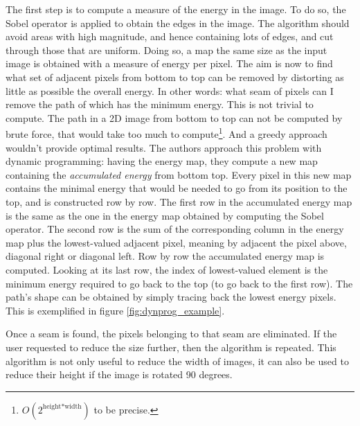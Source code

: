 \documentclass[../main.tex]{subfiles}
\begin{document}
The first step is to compute a measure of the energy in the image. To do so, the Sobel operator is applied to obtain the edges in the image. The algorithm should avoid areas with high magnitude, and hence containing lots of edges, and cut through those that are uniform. Doing so, a map the same size as the input image is obtained with a measure of energy per pixel. The aim is now to find what set of adjacent pixels from bottom to top can be removed by distorting as little as possible the overall energy. In other words: what seam of pixels can I remove the path of which has the minimum energy. This is not trivial to compute. The path in a 2D image from bottom to top can not be computed by brute force, that would take too much to compute\footnote{$O(2^{\text{height*width}})$ to be precise.}. And a greedy approach wouldn't provide optimal results. The authors approach this problem with dynamic programming: having the energy map, they compute a new map containing the \emph{accumulated energy} from bottom top. Every pixel in this new map contains the minimal energy that would be needed to go from its position to the top, and is constructed row by row. The first row in the accumulated energy map is the same as the one in the energy map obtained by computing the Sobel operator. The second row is the sum of the corresponding column in the energy map plus the lowest-valued adjacent pixel, meaning by adjacent the pixel above, diagonal right or diagonal left. Row by row the accumulated energy map is computed. Looking at its last row, the index of lowest-valued element is the minimum energy required to go back to the top (to go back to the first row). The path's shape can be obtained by simply tracing back the lowest energy pixels. This is exemplified in figure \ref{fig:dynprog_example}.

Once a seam is found, the pixels belonging to that seam are eliminated. If the user requested to reduce the size further, then the algorithm is repeated. This algorithm is not only useful to reduce the width of images, it can also be used to reduce their height if the image is rotated 90 degrees.
\end{document}
